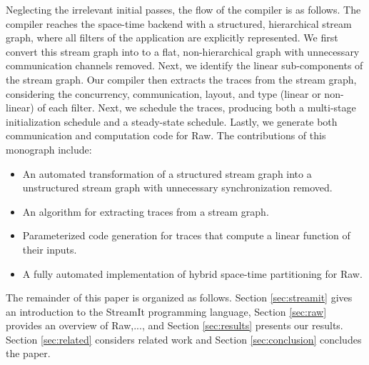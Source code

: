 Neglecting the irrelevant initial passes, the flow of the compiler is
as follows.  The compiler reaches the space-time backend with a
structured, hierarchical stream graph, where all filters of the
application are explicitly represented.  We first convert this stream
graph into to a flat, non-hierarchical graph with unnecessary
communication channels removed.  Next, we identify the linear
sub-components of the stream graph.  Our compiler then extracts the
traces from the stream graph, considering the concurrency,
communication, layout, and type (linear or non-linear) of each filter.
Next, we schedule the traces, producing both a multi-stage initialization
schedule and a steady-state schedule.  Lastly, we generate both
communication and computation code for Raw.  The contributions of this
monograph include:
\begin{itemize}
\item An automated transformation of a structured stream graph into a
unstructured stream graph with unnecessary synchronization removed.
\item An algorithm for extracting traces from a stream graph.
\item Parameterized code generation for traces that compute a
linear function of their inputs.
\item A fully automated implementation of hybrid space-time
partitioning for Raw.
\end{itemize}

The remainder of this paper is organized as follows.  Section 
\ref{sec:streamit} gives an introduction to the StreamIt programming
language, Section \ref{sec:raw} provides an overview of Raw,...,
and Section \ref{sec:results} presents our results.  Section 
\ref{sec:related} considers related work and Section 
\ref{sec:conclusion} concludes the paper.


